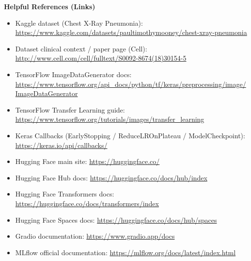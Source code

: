 \documentclass[12pt,a4paper]{article}
\begin{document}
\newpage
{\Large \textbf{Helpful References (Links)}}\\[6pt]
\begin{itemize}[leftmargin=*]
  \item Kaggle dataset (Chest X-Ray Pneumonia): \url{https://www.kaggle.com/datasets/paultimothymooney/chest-xray-pneumonia}
  \item Dataset clinical context / paper page (Cell): \url{http://www.cell.com/cell/fulltext/S0092-8674(18)30154-5}
  \item TensorFlow ImageDataGenerator docs: \url{https://www.tensorflow.org/api_docs/python/tf/keras/preprocessing/image/ImageDataGenerator}
  \item TensorFlow Transfer Learning guide: \url{https://www.tensorflow.org/tutorials/images/transfer_learning}
  \item Keras Callbacks (EarlyStopping / ReduceLROnPlateau / ModelCheckpoint): \url{https://keras.io/api/callbacks/}
  \item Hugging Face main site: \url{https://huggingface.co/}
  \item Hugging Face Hub docs: \url{https://huggingface.co/docs/hub/index}
  \item Hugging Face Transformers docs: \url{https://huggingface.co/docs/transformers/index}
  \item Hugging Face Spaces docs: \url{https://huggingface.co/docs/hub/spaces}
  \item Gradio documentation: \url{https://www.gradio.app/docs}
  \item MLflow official documentation: \url{https://mlflow.org/docs/latest/index.html}
\end{itemize}
\end{document}
